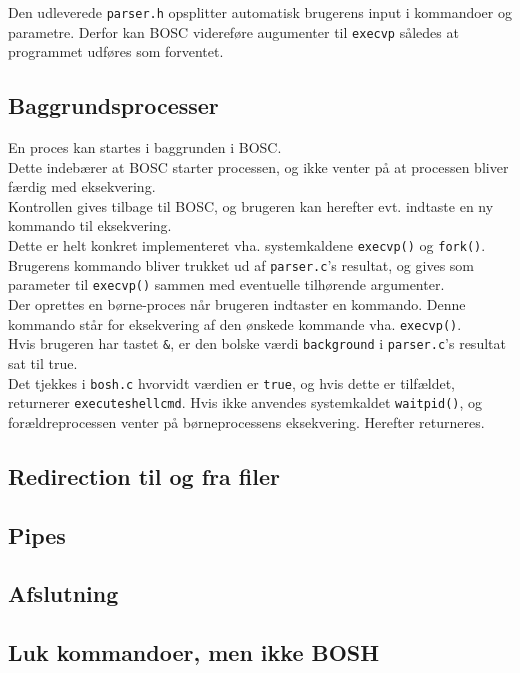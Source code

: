 Den udleverede \verb+parser.h+ opsplitter automatisk brugerens input i kommandoer og parametre. Derfor kan BOSC videreføre augumenter til \verb+execvp+ således at programmet udføres som forventet.
\subsection{Baggrundsprocesser}
En proces kan startes i baggrunden i BOSC. \\ 
Dette indebærer at BOSC starter processen, og ikke venter på at processen bliver færdig med eksekvering. \\
Kontrollen gives tilbage til BOSC, og brugeren kan herefter evt. indtaste en ny kommando til eksekvering. \\
Dette er helt konkret implementeret vha. systemkaldene \verb+execvp()+ og \verb+fork()+. Brugerens kommando bliver trukket ud af \verb+parser.c+'s resultat, og gives som parameter til \verb+execvp()+ sammen med eventuelle tilhørende argumenter. \\
Der oprettes en børne-proces når brugeren indtaster en kommando. Denne kommando står for eksekvering af den ønskede kommande vha. \verb+execvp()+. \\
Hvis brugeren har tastet \verb+&+, er den bolske værdi \verb+background+ i \verb+parser.c+'s resultat sat til true. \\
Det tjekkes i \verb+bosh.c+ hvorvidt værdien er \verb+true+, og hvis dette er tilfældet, returnerer \verb+executeshellcmd+. Hvis ikke anvendes systemkaldet \verb+waitpid()+, og forældreprocessen venter på børneprocessens eksekvering. Herefter returneres.
\subsection{Redirection til og fra filer}
\subsection{Pipes}
\subsection{Afslutning}
\subsection{Luk kommandoer, men ikke BOSH}